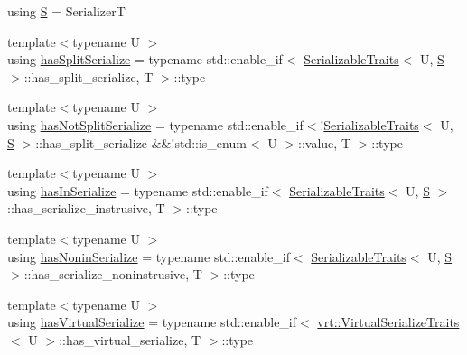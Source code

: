 \begin{DoxyCompactItemize}
\item 
using \hyperlink{structcheckpoint_1_1dispatch_1_1_serializer_dispatch_non_byte_a456d0c02fc35667989d79ddbb0393776}{S} = SerializerT
\item 
{\footnotesize template$<$typename U $>$ }\\using \hyperlink{structcheckpoint_1_1dispatch_1_1_serializer_dispatch_non_byte_a36fe4f2245004d2daa486a9e47b98b71}{has\+Split\+Serialize} = typename std\+::enable\+\_\+if$<$ \hyperlink{structcheckpoint_1_1_serializable_traits}{Serializable\+Traits}$<$ U, \hyperlink{structcheckpoint_1_1dispatch_1_1_serializer_dispatch_non_byte_a456d0c02fc35667989d79ddbb0393776}{S} $>$\+::has\+\_\+split\+\_\+serialize, T $>$\+::type
\item 
{\footnotesize template$<$typename U $>$ }\\using \hyperlink{structcheckpoint_1_1dispatch_1_1_serializer_dispatch_non_byte_a596c2f6081cc55d5ff0b7486f50b227b}{has\+Not\+Split\+Serialize} = typename std\+::enable\+\_\+if$<$!\hyperlink{structcheckpoint_1_1_serializable_traits}{Serializable\+Traits}$<$ U, \hyperlink{structcheckpoint_1_1dispatch_1_1_serializer_dispatch_non_byte_a456d0c02fc35667989d79ddbb0393776}{S} $>$\+::has\+\_\+split\+\_\+serialize \&\&!std\+::is\+\_\+enum$<$ U $>$\+::value, T $>$\+::type
\item 
{\footnotesize template$<$typename U $>$ }\\using \hyperlink{structcheckpoint_1_1dispatch_1_1_serializer_dispatch_non_byte_aee0190efdd8f0239a09883a9f59a4dd1}{has\+In\+Serialize} = typename std\+::enable\+\_\+if$<$ \hyperlink{structcheckpoint_1_1_serializable_traits}{Serializable\+Traits}$<$ U, \hyperlink{structcheckpoint_1_1dispatch_1_1_serializer_dispatch_non_byte_a456d0c02fc35667989d79ddbb0393776}{S} $>$\+::has\+\_\+serialize\+\_\+instrusive, T $>$\+::type
\item 
{\footnotesize template$<$typename U $>$ }\\using \hyperlink{structcheckpoint_1_1dispatch_1_1_serializer_dispatch_non_byte_aee9d815f18b48855fefbecbbbf60436b}{has\+Nonin\+Serialize} = typename std\+::enable\+\_\+if$<$ \hyperlink{structcheckpoint_1_1_serializable_traits}{Serializable\+Traits}$<$ U, \hyperlink{structcheckpoint_1_1dispatch_1_1_serializer_dispatch_non_byte_a456d0c02fc35667989d79ddbb0393776}{S} $>$\+::has\+\_\+serialize\+\_\+noninstrusive, T $>$\+::type
\item 
{\footnotesize template$<$typename U $>$ }\\using \hyperlink{structcheckpoint_1_1dispatch_1_1_serializer_dispatch_non_byte_a51b98addaa52e3e576c48c150aa66583}{has\+Virtual\+Serialize} = typename std\+::enable\+\_\+if$<$ \hyperlink{structcheckpoint_1_1dispatch_1_1vrt_1_1_virtual_serialize_traits}{vrt\+::\+Virtual\+Serialize\+Traits}$<$ U $>$\+::has\+\_\+virtual\+\_\+serialize, T $>$\+::type

\end{DoxyCompactItemize}
